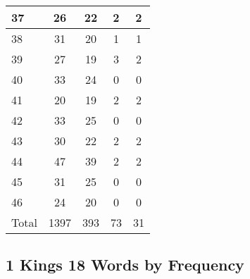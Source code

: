 \begin{center}
\begin{longtable}{l|c|c|c|c}
37 & 26 & 22 & 2 & 2\\ \hline
38 & 31 & 20 & 1 & 1\\ \hline
39 & 27 & 19 & 3 & 2\\ \hline
40 & 33 & 24 & 0 & 0\\ \hline
41 & 20 & 19 & 2 & 2\\ \hline
42 & 33 & 25 & 0 & 0\\ \hline
43 & 30 & 22 & 2 & 2\\ \hline
44 & 47 & 39 & 2 & 2\\ \hline
45 & 31 & 25 & 0 & 0\\ \hline
46 & 24 & 20 & 0 & 0\\ \hline
Total & 1397 & 393 & 73 & 31
\end{longtable}
\end{center}





\subsection{1 Kings 18 Words by Frequency}


\normalsize
 
